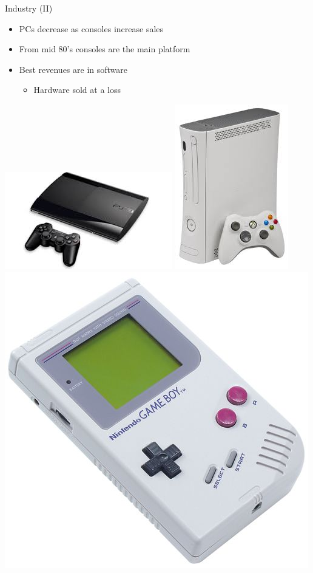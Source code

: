 \documentclass[10pt,compress]{beamer} %
\begin{document}
\begin{frame}{Industry (II)}
	\begin{itemize}
		\item PCs decrease as consoles increase sales
		\item From mid 80's consoles are the main platform
		\item Best revenues are in software
		\begin{itemize}
		\item Hardware sold at a loss
		\end{itemize}
	\end{itemize}

	\begin{center}
	\includegraphics[width=0.3\linewidth]{figs/ps3.jpeg}
	\includegraphics[width=0.15\linewidth]{figs/xbox.jpeg}
	\includegraphics[width=0.2\linewidth]{figs/gameboy}
	\end{center}
\end{frame}
\end{document}
